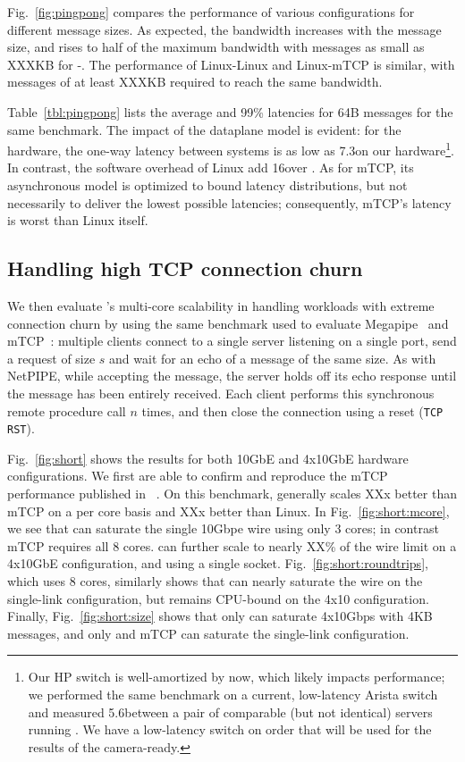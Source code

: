 Fig.~\ref{fig:pingpong} compares the performance of various
configurations for different message sizes.  As expected, the
bandwidth increases with the message size, and rises to half of the
maximum bandwidth with messages as small as XXXKB for \ix-\ix.  The performance of Linux-Linux and Linux-mTCP is similar, with messages of at least XXXKB required to reach the same bandwidth.


Table~\ref{tbl:pingpong} lists the average and 99\% latencies for 64B
messages for the same benchmark.  The impact of the \ix dataplane
model is evident: for the hardware, the one-way latency between \ix
systems is as low as 7.3\microsecond on our hardware\footnote{Our HP
  switch is well-amortized by now, which likely impacts
  performance; we performed the same benchmark on a current, low-latency Arista
  switch and measured 5.6\microsecond between a pair of comparable
  (but not identical) servers running \ix. We have a low-latency switch on order
  that will be used for the results of the camera-ready.}.  In
contrast, the software overhead of Linux add 16\microsecond over
\ix. As for mTCP, its asynchronous model is optimized to bound latency
distributions, but not necessarily to deliver the lowest possible
latencies; consequently, mTCP's latency is worst than Linux itself.



\subsection{Handling high TCP connection churn}
\label{sec:eval:short}


We then evaluate \ix's multi-core scalability in handling workloads
with extreme connection churn by using the same benchmark used to evaluate
Megapipe~\cite{han2012megapipe} and mTCP~\cite{jeong2014mtcp}:
multiple clients connect to a single server listening on a single
port, send a request of size $s$ and wait for an echo of a message of
the same size.  As with NetPIPE, while accepting the message, the server holds off its
echo response until the message has been entirely received.
Each client performs this synchronous remote procedure
call $n$ times, and then close the connection using a reset
(\texttt{TCP RST}).


 Fig.~\ref{fig:short} shows the results for both
10GbE and 4x10GbE hardware configurations.  We first
are able to confirm and reproduce the mTCP performance published in
~\cite{jeong2014mtcp}.  On this benchmark, \ix generally scales XXx
better than mTCP on a per core basis and XXx better than Linux.  In
Fig.~\ref{fig:short:mcore}, we see that \ix can saturate the single
10Gbpe wire using only 3 cores; in contrast mTCP requires all 8
cores. \ix can further scale to nearly XX\% of the wire limit on a
4x10GbE configuration, and using a single socket.
Fig.~\ref{fig:short:roundtrips}, which uses 8 cores, similarly shows
that \ix can nearly saturate the wire on the single-link
configuration, but remains CPU-bound on the 4x10 configuration.
Finally, Fig.~\ref{fig:short:size} shows that only \ix can saturate
4x10Gbps with 4KB messages, and only \ix and mTCP can saturate the
single-link configuration.


